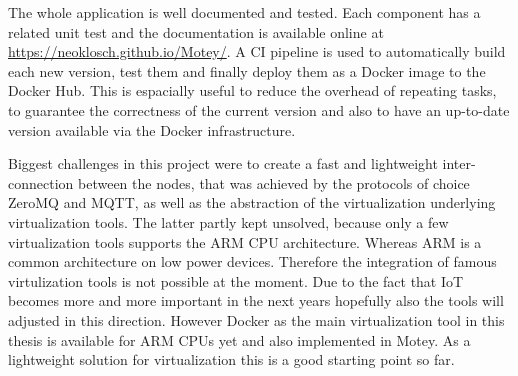 The whole application is well documented and tested.
Each component has a related unit test and the documentation is available online at \url{https://neoklosch.github.io/Motey/}.
A \ac{CI} pipeline is used to automatically build each new version, test them and finally deploy them as a Docker image to the Docker Hub.
This is espacially useful to reduce the overhead of repeating tasks, to guarantee the correctness of the current version and also to have an up-to-date version available via the Docker infrastructure.

Biggest challenges in this project were to create a fast and lightweight inter-connection between the nodes, that was achieved by the protocols of choice ZeroMQ and \ac{MQTT}, as well as the abstraction of the virtualization underlying virtualization tools.
The latter partly kept unsolved, because only a few virtualization tools supports the ARM \ac{CPU} architecture.
Whereas ARM is a common architecture on low power devices.
Therefore the integration of famous virtulization tools is not possible at the moment.
Due to the fact that \ac{IoT} becomes more and more important in the next years hopefully also the tools will adjusted in this direction.
However Docker as the main virtualization tool in this thesis is available for ARM \acp{CPU} yet and also implemented in Motey.
As a lightweight solution for virtualization this is a good starting point so far.


%
%



